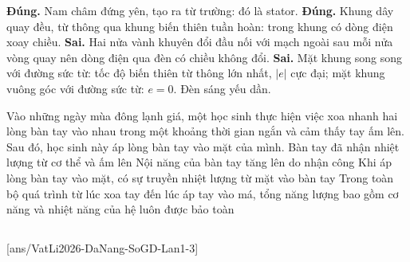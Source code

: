 \begin{ex}
{\begin{itemchoice}
				\itemch \textbf{Đúng.} Nam châm đứng yên, tạo ra từ trường: đó là stator.
				\itemch \textbf{Đúng.} Khung dây quay đều, từ thông qua khung biến thiên tuần hoàn: trong khung có dòng điện xoay chiều.
				\itemch \textbf{Sai.} Hai nửa vành khuyên đổi đầu nối với mạch ngoài sau mỗi nửa vòng quay nên dòng điện qua đèn có chiều không đổi.
				\itemch \textbf{Sai.} Mặt khung song song với đường sức từ: tốc độ biến thiên từ thông lớn nhất, $|e|$ cực đại; mặt khung vuông góc với đường sức từ: $e=0$. Đèn sáng yếu dần.
			\end{itemchoice}
		}
	\end{ex}

	\begin{ex}%
		Vào những ngày mùa đông lạnh giá, một học sinh thực hiện việc xoa nhanh hai lòng bàn tay vào nhau trong một khoảng thời gian ngắn và cảm thấy tay ấm lên. Sau đó, học sinh này áp lòng bàn tay vào mặt của mình.
		\choiceTFt
		{Bàn tay đã nhận nhiệt lượng từ cơ thể và ấm lên}
		{\True Nội năng của bàn tay tăng lên do nhận công}
		{Khi áp lòng bàn tay vào mặt, có sự truyền nhiệt lượng từ mặt vào bàn tay}
		{\True Trong toàn bộ quá trình từ lúc xoa tay đến lúc áp tay vào má, tổng năng lượng bao gồm cơ năng và nhiệt năng của hệ luôn được bảo toàn}
	\end{ex}

	\subsection*{}
	\setcounter{ex}{0}
	[ans/VatLi2026-DaNang-SoGD-Lan1-3]

